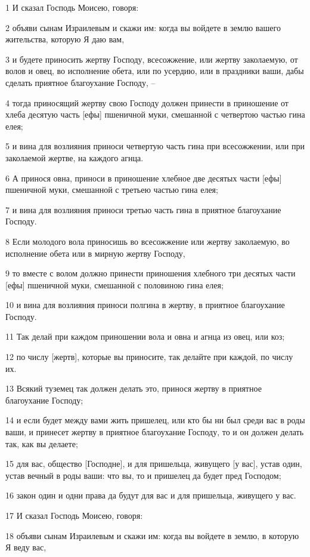 \par 1 И сказал Господь Моисею, говоря:
\par 2 объяви сынам Израилевым и скажи им: когда вы войдете в землю вашего жительства, которую Я даю вам,
\par 3 и будете приносить жертву Господу, всесожжение, или жертву заколаемую, от волов и овец, во исполнение обета, или по усердию, или в праздники ваши, дабы сделать приятное благоухание Господу, --
\par 4 тогда приносящий жертву свою Господу должен принести в приношение от хлеба десятую часть [ефы] пшеничной муки, смешанной с четвертою частью гина елея;
\par 5 и вина для возлияния приноси четвертую часть гина при всесожжении, или при заколаемой жертве, на каждого агнца.
\par 6 А принося овна, приноси в приношение хлебное две десятых части [ефы] пшеничной муки, смешанной с третьею частью гина елея;
\par 7 и вина для возлияния приноси третью часть гина в приятное благоухание Господу.
\par 8 Если молодого вола приносишь во всесожжение или жертву заколаемую, во исполнение обета или в мирную жертву Господу,
\par 9 то вместе с волом должно принести приношения хлебного три десятых части [ефы] пшеничной муки, смешанной с половиною гина елея;
\par 10 и вина для возлияния приноси полгина в жертву, в приятное благоухание Господу.
\par 11 Так делай при каждом приношении вола и овна и агнца из овец, или коз;
\par 12 по числу [жертв], которые вы приносите, так делайте при каждой, по числу их.
\par 13 Всякий туземец так должен делать это, принося жертву в приятное благоухание Господу;
\par 14 и если будет между вами жить пришелец, или кто бы ни был среди вас в роды ваши, и принесет жертву в приятное благоухание Господу, то и он должен делать так, как вы делаете;
\par 15 для вас, общество [Господне], и для пришельца, живущего [у вас], устав один, устав вечный в роды ваши: что вы, то и пришелец да будет пред Господом;
\par 16 закон один и одни права да будут для вас и для пришельца, живущего у вас.
\par 17 И сказал Господь Моисею, говоря:
\par 18 объяви сынам Израилевым и скажи им: когда вы войдете в землю, в которую Я веду вас,

